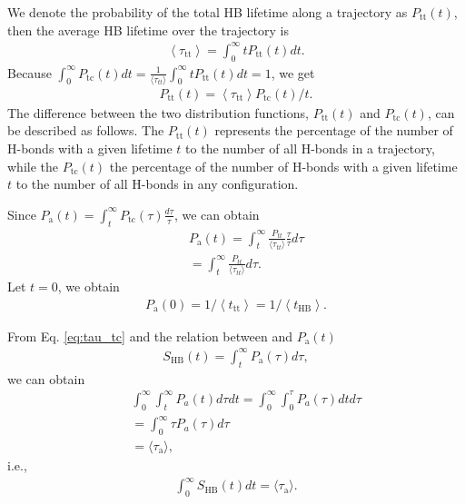 We denote the probability of the total HB lifetime along a trajectory as $P_{\mathrm{tt}}(t)$,
then the average HB lifetime over the trajectory is
\begin{eqnarray}
\left\langle\tau_{\mathrm{tt}}\right\rangle=\int_{0}^{\infty} t P_{\mathrm{tt}}(t) d t.
\label{eq:relation_tau_tt}
\end{eqnarray}
Because $\int_{0}^{\infty} P_{\mathrm{tc}}(t) d t=\frac{1}{\langle \tau_{tt}\rangle} \int_{0}^{\infty} t P_{\mathrm{tt}}(t) d t = 1$, 
we get 
\begin{eqnarray}
P_{\mathrm{tt}}(t)=\left\langle \tau_{\mathrm{tt}}\right\rangle P_{\mathrm{tc}}(t) / t.
\label{eq:relation_P_tt--P_tc}
\end{eqnarray}
The difference between the two distribution functions, $P_{\mathrm{tt}}(t)$ and $P_{\mathrm{tc}}(t)$, can be described as follows.
The $P_{\mathrm{tt}}(t)$ represents the percentage of the number of H-bonds with a given lifetime $t$ to the number of all H-bonds in a trajectory, 
while the $P_{\mathrm{tc}}(t)$ the percentage of the number of H-bonds with a given lifetime $t$ to the number of all H-bonds in any configuration. 
\cite{VPV09}

Since $P_{\mathrm{a}}(t)=\int_{t}^{\infty} P_{\mathrm{tc}}(\tau) \frac{d \tau}{\tau}$,
we can obtain
\begin{eqnarray}
&& P_{\mathrm{a}}(t)=\int_t^\infty \frac{P_{tt}}{\langle\tau_{tt}\rangle} \frac{\tau}{\tau} d\tau \nonumber \\
&& =  \int_t^\infty \frac{P_{tt}}{\langle\tau_{tt}\rangle}d\tau. \nonumber
\label{eq:P_a}
\end{eqnarray}
Let $t=0$, we obtain
\begin{eqnarray}
P_{\mathrm{a}}(0)=1 /\left\langle t_{\mathrm{tt}}\right\rangle = 1 /\left\langle t_{\mathrm{HB}}\right\rangle.
\label{eq:P_a0}
\end{eqnarray}

From Eq. \ref{eq:tau_tc} and the relation between \SHB and $P_{\mathrm{a}}(t)$
\begin{eqnarray}
S_{\mathrm{HB}}(t)=\int_{t}^{\infty} P_{\mathrm{a}}(\tau) d \tau,
\label{eq:P_a}
\end{eqnarray}
we can obtain
%
\begin{eqnarray}
&&\int_{0}^{\infty} \int_{t}^{\infty} P_{a}(t) d \tau d t = \int_{0}^{\infty} \int_{0}^{\tau} P_{a}(\tau) d t d \tau \nonumber \\
&& = \int_{0}^{\infty} \tau P_{a}(\tau) d \tau \nonumber \\
&& = \langle \tau_{\mathrm{a}} \rangle, \nonumber
\end{eqnarray}
i.e., 
\begin{eqnarray}
\int_{0}^{\infty}  S_{\mathrm{HB}}(t) d t = \langle \tau_{\mathrm{a}} \rangle.
\label{eq:int_Ca}
\end{eqnarray}
